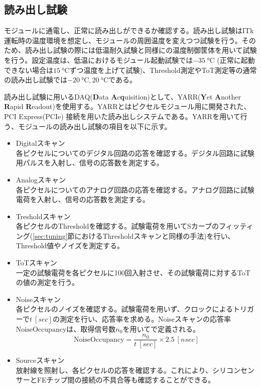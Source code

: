 \subsection{読み出し試験}
\label{sec:electricaltest}
モジュールに通電し、正常に読み出しができるか確認する。読み出し試験はITk運転時の温度環境を想定し、モジュールの周囲温度を変えつつ試験を行う。そのため、読み出し試験の際には低温耐久試験と同様にの温度制御筐体を用いて試験を行う。設定温度は、低温におけるモジュール起動試験では$-35\ \si{\degreeCelsius}$ (正常に起動できない場合は$15\ \si{\degreeCelsius}$ずつ温度を上げて試験)、Threshold測定やToT測定等の通常の読み出し試験では$-20\ \si{\degreeCelsius}, 20\ \si{\degreeCelsius}$である。

読み出し試験に用いるDAQ(\textbf{D}ata \textbf{A}c\textbf{q}uisition)として、YARR(\textbf{Y}et \textbf{A}nother \textbf{R}apid \textbf{R}eadout)を使用する。YARRとはピクセルモジュール用に開発された、PCI Express(PCIe) 接続を用いた読み出しシステムである。YARRを用いて行う、モジュールの読み出し試験の項目を以下に示す。

\begin{itemize}
  \item Digitalスキャン \\
  各ピクセルについてのデジタル回路の応答を確認する。デジタル回路に試験用パルスを入射し、信号の応答数を測定する。
  \item Analogスキャン \\
  各ピクセルについてのアナログ回路の応答を確認する。アナログ回路に試験電荷を入射し、信号の応答数を測定する。
  \item Tresholdスキャン \\
  各ピクセルのThresholdを確認する。試験電荷を用いてSカーブのフィッティング(\ref{sec:tuning}節におけるThresholdスキャンと同様の手法)を行い、Threshold値やノイズを測定する。
  \item ToTスキャン \\
  一定の試験電荷を各ピクセルに100回入射させ、その試験電荷に対するToTの値の測定を行う。
  \item Noiseスキャン \\
  各ピクセルのノイズを確認する。試験電荷を用いず、クロックによるトリガーで$t\ [\si{sec}]$の測定を行い、応答率を求める。Noiseスキャンの応答率$\mathrm{NoiseOccupancy}$は、取得信号数$n_0$を用いてで定義される。
  \begin{equation}
  \label{eq:noise}
  \mathrm{NoiseOccupancy} = \frac{n_0}{t\ [\si{sec}]}\times 2.5\ [\si{nsec}]
  \end{equation}
  \item Sourceスキャン \\
  放射線を照射し、各ピクセルの応答を確認する。これにより、シリコンセンサーとFEチップ間の接続の不具合等も確認することができる。
\end{itemize}

